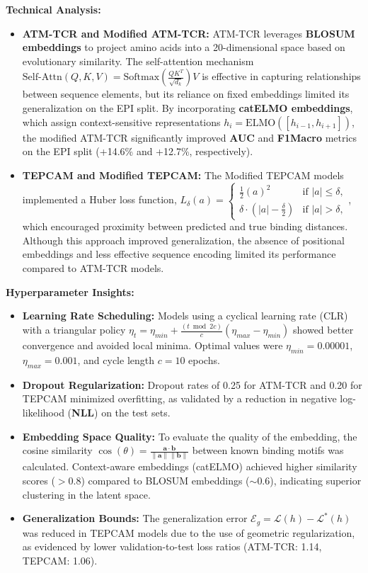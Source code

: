 \documentclass[11pt,a4paper]{article}
\begin{document}
\textbf{Technical Analysis:}
\begin{itemize}
    \item \textbf{ATM-TCR and Modified ATM-TCR:} ATM-TCR leverages \textbf{BLOSUM embeddings} to project amino acids into a 20-dimensional space based on evolutionary similarity. The self-attention mechanism $\text{Self-Attn}(Q, K, V) = \text{Softmax}\left(\frac{QK^T}{\sqrt{d_k}}\right)V$ is effective in capturing relationships between sequence elements, but its reliance on fixed embeddings limited its generalization on the EPI split. By incorporating \textbf{catELMO embeddings}, which assign context-sensitive representations $h_{i} = \text{ELMO}([h_{i-1}, h_{i+1}])$, the modified ATM-TCR significantly improved \textbf{AUC} and \textbf{F1Macro} metrics on the EPI split (+14.6\% and +12.7\%, respectively).
    \item \textbf{TEPCAM and Modified TEPCAM:} The Modified TEPCAM models implemented a Huber loss function, $L_{\delta}(a) =
    \begin{cases} 
    \frac{1}{2}(a)^2 & \text{if } |a| \leq \delta, \\
    \delta \cdot (|a| - \frac{\delta}{2}) & \text{if } |a| > \delta,
    \end{cases}$, which encouraged proximity between predicted and true binding distances. Although this approach improved generalization, the absence of positional embeddings and less effective sequence encoding limited its performance compared to ATM-TCR models.
\end{itemize}

\textbf{Hyperparameter Insights:}
\begin{itemize}
    \item \textbf{Learning Rate Scheduling:} Models using a cyclical learning rate (CLR) with a triangular policy $\eta_t = \eta_{min} + \frac{(t \bmod 2c)}{c}(\eta_{max} - \eta_{min})$ showed better convergence and avoided local minima. Optimal values were $\eta_{min} = 0.00001$, $\eta_{max} = 0.001$, and cycle length $c=10$ epochs.
    \item \textbf{Dropout Regularization:} Dropout rates of 0.25 for ATM-TCR and 0.20 for TEPCAM minimized overfitting, as validated by a reduction in negative log-likelihood (\textbf{NLL}) on the test sets.

    \item \textbf{Embedding Space Quality:}
    To evaluate the quality of the embedding, the cosine similarity $\cos(\theta) = \frac{\mathbf{a} \cdot \mathbf{b}}{\|\mathbf{a}\| \|\mathbf{b}\|}$ between known binding motifs was calculated. Context-aware embeddings (catELMO) achieved higher similarity scores ($>0.8$) compared to BLOSUM embeddings ($\sim0.6$), indicating superior clustering in the latent space.
    
    \item \textbf{Generalization Bounds:}
    The generalization error $\mathcal{E}_g = \mathcal{L}(h) - \mathcal{L}^*(h)$ was reduced in TEPCAM models due to the use of geometric regularization, as evidenced by lower validation-to-test loss ratios (ATM-TCR: 1.14, TEPCAM: 1.06).

\end{itemize}
\end{document}
